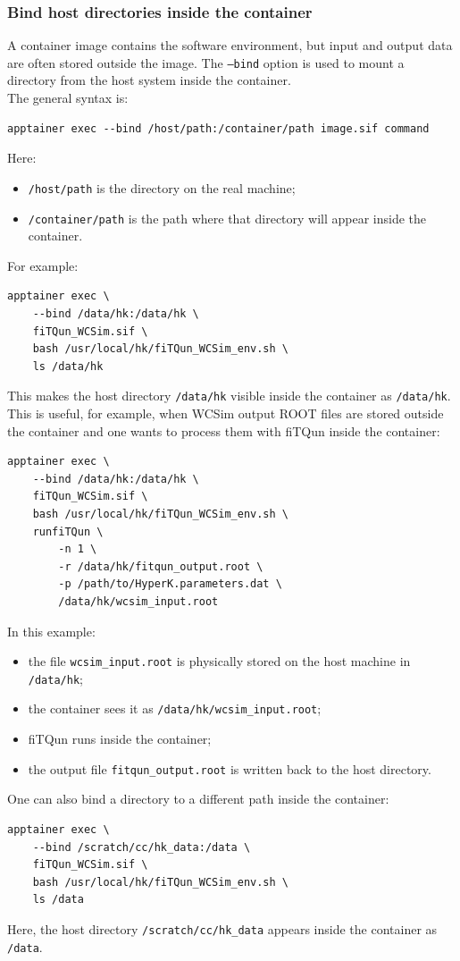 \documentclass{article}
\numberwithin{table}{subsection}
\numberwithin{figure}{subsection}
\numberwithin{equation}{subsection}
\numberwithin{footnote}{subsection}
\begin{document}
\subsubsection{Bind host directories inside the container}
A container image contains the software environment, but input and output data are often stored outside the image. The \texttt{--bind} option is used to mount a directory from the host system inside the container.\\
The general syntax is:
\begin{lstlisting}[style=terminal]
apptainer exec --bind /host/path:/container/path image.sif command
\end{lstlisting}
Here:
\begin{itemize}
    \item \texttt{/host/path} is the directory on the real machine;
    \item \texttt{/container/path} is the path where that directory will appear
    inside the container.
\end{itemize}
For example:
\begin{lstlisting}[style=terminal]
apptainer exec \
    --bind /data/hk:/data/hk \
    fiTQun_WCSim.sif \
    bash /usr/local/hk/fiTQun_WCSim_env.sh \
    ls /data/hk
\end{lstlisting}
This makes the host directory \texttt{/data/hk} visible inside the container as \texttt{/data/hk}.\\
This is useful, for example, when WCSim output ROOT files are stored outside the container and one wants to process them with fiTQun inside the container:
\begin{lstlisting}[style=terminal]
apptainer exec \
    --bind /data/hk:/data/hk \
    fiTQun_WCSim.sif \
    bash /usr/local/hk/fiTQun_WCSim_env.sh \
    runfiTQun \
        -n 1 \
        -r /data/hk/fitqun_output.root \
        -p /path/to/HyperK.parameters.dat \
        /data/hk/wcsim_input.root
\end{lstlisting}
In this example:
\begin{itemize}
    \item the file \texttt{wcsim\_input.root} is physically stored on the host machine in \texttt{/data/hk};
    \item the container sees it as \texttt{/data/hk/wcsim\_input.root};
    \item fiTQun runs inside the container;
    \item the output file \texttt{fitqun\_output.root} is written back to the host directory.
\end{itemize}
One can also bind a directory to a different path inside the container:
\begin{lstlisting}[style=terminal]
apptainer exec \
    --bind /scratch/cc/hk_data:/data \
    fiTQun_WCSim.sif \
    bash /usr/local/hk/fiTQun_WCSim_env.sh \
    ls /data
\end{lstlisting}
Here, the host directory \texttt{/scratch/cc/hk\_data} appears inside the
container as \texttt{/data}.
\end{document}
